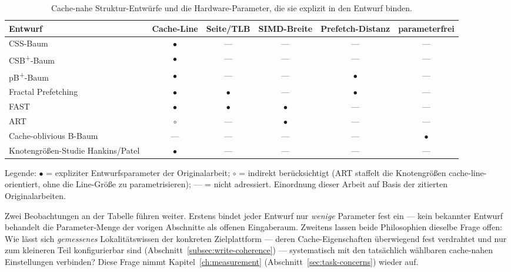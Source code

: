 \begin{nurlang}
\begin{table}[!htbp]
  \caption{Cache-nahe Struktur-Entwürfe und die Hardware-Parameter, die sie explizit in den Entwurf
  binden.}\label{tab:structure-parameters}
  \centering\footnotesize
  \setlength{\tabcolsep}{4pt}%
  \begin{tabular}{@{}l c c c c c@{}}
    \toprule
    \textbf{Entwurf} & \textbf{Cache-Line} & \textbf{Seite/TLB} & \textbf{SIMD-Breite} &
    \textbf{Prefetch-Distanz} & \textbf{parameterfrei} \\
    \midrule
    CSS-Baum~\cite{rao1999css}                         & $\bullet$ & ---       & ---       & ---       & --- \\
    CSB\textsuperscript{+}-Baum~\cite{rao2000csb}      & $\bullet$ & ---       & ---       & ---       & --- \\
    pB\textsuperscript{+}-Baum~\cite{chen2001prefetch} & $\bullet$ & ---       & ---       & $\bullet$ & --- \\
    Fractal Prefetching~\cite{chen2002fractal}         & $\bullet$ & $\bullet$ & ---       & $\bullet$ & --- \\
    FAST~\cite{kim2010fast}                            & $\bullet$ & $\bullet$ & $\bullet$ & ---       & --- \\
    ART~\cite{leis2013art}                             & $\circ$   & ---       & $\bullet$ & ---       & --- \\
    Cache-oblivious B-Baum~\cite{bender2005coboblivious} & ---     & ---       & ---       & ---       & $\bullet$ \\
    Knotengrößen-Studie Hankins/Patel~\cite{hankins2003nodesize} & $\bullet$ & --- & ---   & ---       & --- \\
    \bottomrule
  \end{tabular}
  \par\medskip\footnotesize
  Legende: $\bullet$ = expliziter Entwurfsparameter der Originalarbeit; $\circ$ = indirekt
  berücksichtigt (ART staffelt die Knotengrößen cache-line-orientiert, ohne die Line-Größe zu
  parametrisieren); --- = nicht adressiert. Einordnung dieser Arbeit auf Basis der zitierten
  Originalarbeiten.
\end{table}

Zwei Beobachtungen an der Tabelle führen weiter. Erstens bindet jeder Entwurf nur \emph{wenige}
Parameter fest ein --- kein bekannter Entwurf behandelt die Parameter-Menge der vorigen Abschnitte
als offenen Eingaberaum. Zweitens lassen beide Philosophien dieselbe Frage offen: Wie lässt sich
\emph{gemessenes} Lokalitätswissen der konkreten Zielplattform --- deren Cache-Eigenschaften
überwiegend fest verdrahtet und nur zum kleineren Teil konfigurierbar sind
(Abschnitt~\ref{subsec:write-coherence}) --- systematisch mit den tatsächlich wählbaren cache-nahen
Einstellungen verbinden? Diese Frage nimmt Kapitel~\ref{ch:measurement}
(Abschnitt~\ref{sec:task-concerns}) wieder auf.
\end{nurlang}
